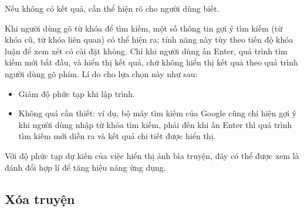 \documentclass[../../thesis]{subfiles}
\begin{document}
Nếu không có kết quả, cần thể hiện rõ cho người dùng biết.

Khi người dùng gõ từ khóa để tìm kiếm, một số thông tin gợi ý tìm kiếm (từ khóa
cũ, từ khóa liên quan) có thể hiện ra; tính năng này tùy theo tiến độ khóa luận
để xem xét có cài đặt không. Chỉ khi người dùng ấn Enter, quá trình tìm kiếm mới
bắt đầu, và hiển thị kết quả, chứ không hiển thị kết quả theo quá trình người
dùng gõ phím. Lí do cho lựa chọn này như sau:

\begin{itemize}
    \item
        Giảm độ phức tạp khi lập trình.
    \item
        Không quá cần thiết: ví dụ, bộ máy tìm kiếm của Google cũng chỉ hiện gợi
        ý khi người dùng nhập từ khóa tìm kiếm, phải đến khi ấn Enter thì quá
        trình tìm kiếm mới diễn ra và kết quả chi tiết được hiển thị.
\end{itemize}

Với độ phức tạp dự kiến của việc hiển thị ảnh bìa truyện, đây có thể được xem là
đánh đổi hợp lí để tăng hiệu năng ứng dụng.

\subsection{Xóa truyện}\label{sec:delete-comic}
\end{document}
